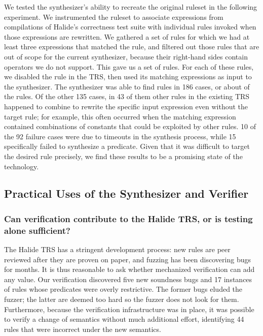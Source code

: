 \documentclass[acmsmall,review]{acmart}\settopmatter{printfolios=true,printccs=false,printacmref=false}
\begin{document}
We tested the synthesizer's ability to recreate the original ruleset in the following experiment. We instrumented the ruleset to associate expressions from compilations of Halide's correctness test suite with individual rules invoked when those expressions are rewritten. We gathered a set of rules for which we had at least three expressions that matched the rule, and filtered out those rules that are out of scope for the current synthesizer, because their right-hand sides contain operators we do not support. This gave us a set of \NumRulesInCorrectnessExperiment{} rules. For each of these rules, we disabled the rule in the TRS, then used its matching expressions as input to the synthesizer. The synthesizer was able to find rules in 186 cases, or about \PercentRulesResynthesized{} of the rules. Of the other 135 cases, in 43 of them other rules in the existing TRS happened to combine to rewrite the specific input expression even without the target rule; for example, this often occurred when the matching expression contained combinations of constants that could be exploited by other rules. 10 of the 92 failure cases were due to timeouts in the synthesis process, while 15 specifically failed to synthesize a predicate. Given that it was difficult to target the desired rule precisely, we find these results to be a promising state of the technology.


\subsection{Practical Uses of the Synthesizer and Verifier}

\subsubsection{Can verification contribute to the Halide TRS, or is testing alone sufficient?}
\label{sec:eval-correctness}

The Halide TRS has a stringent development process: new rules are peer reviewed after they are proven on paper, and fuzzing has been discovering bugs for months. It is thus reasonable to ask whether mechanized verification can add any value. Our verification discovered five new soundness bugs and 17 instances of rules whose predicates were overly restrictive. The former bugs eluded the fuzzer; the latter are deemed too hard so the fuzzer does not look for them. Furthermore, because the verification infrastructure was in place, it was possible to verify a change of semantics without much additional effort, identifying 44 rules that were incorrect under the new semantics.
\end{document}
